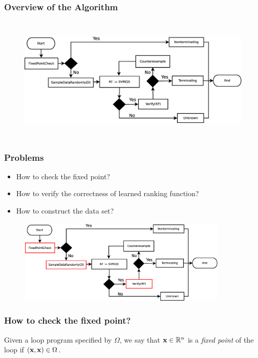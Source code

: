 \begin{frame}
\frametitle{Overview of the Algorithm}
\begin{figure}  %
  \includegraphics[width=12cm,height = 6cm]{pictures/Structure}  
\end{figure}
\end{frame}

\begin{frame}
\frametitle{Problems}
\begin{itemize}
\item How to check the fixed point?
\item How to verify the correctness of learned ranking function?
\item How to construct the data set?
\end{itemize}
\begin{figure}  %
  \includegraphics[width=10cm,height = 4cm]{pictures/Problem}  
\end{figure}
\end{frame}

\begin{frame}
\frametitle{How to check the fixed point?}
\begin{myDefinition}
\label{def:fixedPoint}
	Given a loop program specified by $\Omega$, we say that $\mathbf{x} \in \mathbb{R}^{n}$ is a \emph{fixed point} of the loop if $(\mathbf{x}, \mathbf{x}) \in \Omega$.
\end{myDefinition}
\end{frame}


